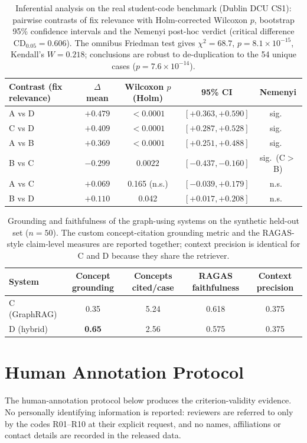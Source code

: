 \documentclass[sageh]{sagej}
\begin{document}
\begin{table}[h]
\centering
\caption{Inferential analysis on the real student-code benchmark (Dublin DCU CS1): pairwise contrasts of fix relevance with Holm-corrected Wilcoxon $p$, bootstrap 95\% confidence intervals and the Nemenyi post-hoc verdict (critical difference $\mathrm{CD}_{0.05}=0.606$). The omnibus Friedman test gives $\chi^2=68.7$, $p=8.1\times10^{-15}$, Kendall's $W=0.218$; conclusions are robust to de-duplication to the 54 unique cases ($p=7.6\times10^{-14}$).\label{tab:dublinstats}}
\begin{tabular}{@{}lcccc@{}}
\toprule
Contrast (fix relevance) & $\Delta$ mean & Wilcoxon $p$ (Holm) & 95\% CI & Nemenyi \\
\midrule
A vs D & $+0.479$ & $<0.0001$ & $[+0.363,+0.590]$ & sig.\ \\
C vs D & $+0.409$ & $<0.0001$ & $[+0.287,+0.528]$ & sig.\ \\
A vs B & $+0.369$ & $<0.0001$ & $[+0.251,+0.488]$ & sig.\ \\
B vs C & $-0.299$ & $0.0022$  & $[-0.437,-0.160]$ & sig.\ (C$>$B) \\
A vs C & $+0.069$ & 0.165 (n.s.) & $[-0.039,+0.179]$ & n.s.\ \\
B vs D & $+0.110$ & 0.042 & $[+0.017,+0.208]$ & n.s.\ \\
\bottomrule
\end{tabular}
\end{table}

\begin{table}[h]
\centering
\caption{Grounding and faithfulness of the graph-using systems on the synthetic held-out set ($n=50$). The custom concept-citation grounding metric and the RAGAS-style claim-level measures are reported together; context precision is identical for C and D because they share the retriever.\label{tab:grounding}}
\begin{tabular}{@{}lcccc@{}}
\toprule
System & Concept grounding & Concepts cited/case & RAGAS faithfulness & Context precision \\
\midrule
C (GraphRAG) & 0.35 & 5.24 & 0.618 & 0.375 \\
D (hybrid)   & \textbf{0.65} & 2.56 & 0.575 & 0.375 \\
\bottomrule
\end{tabular}
\end{table}

\section{Human Annotation Protocol}\label{app:protocol}
The human-annotation protocol below produces the criterion-validity evidence. No personally identifying information is reported: reviewers are referred to only by the codes R01--R10 at their explicit request, and no names, affiliations or contact details are recorded in the released data.
\end{document}
